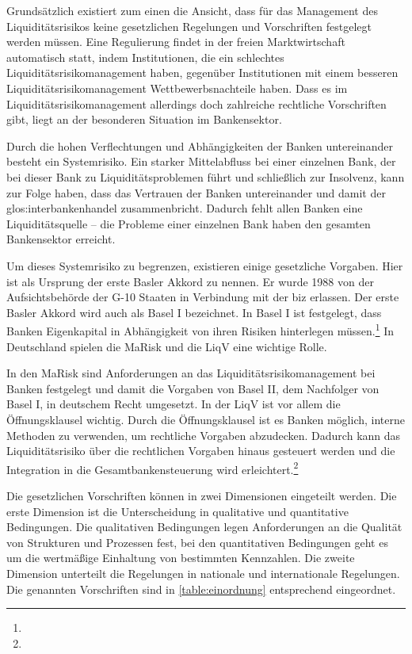 \begin{onehalfspacing}
Grundsätzlich existiert zum einen die Ansicht, dass für das Management des Liquiditätsrisikos keine gesetzlichen Regelungen und Vorschriften festgelegt werden müssen. Eine Regulierung findet in der freien Marktwirtschaft automatisch statt, indem Institutionen, die ein schlechtes Liquiditätsrisikomanagement haben, gegenüber Institutionen mit einem besseren Liquiditätsrisikomanagement Wettbewerbsnachteile haben. Dass es im Liquiditätsrisikomanagement allerdings doch zahlreiche rechtliche Vorschriften gibt, liegt an der besonderen Situation im Bankensektor.

Durch die hohen Verflechtungen und Abhängigkeiten der Banken untereinander besteht ein Systemrisiko. Ein starker Mittelabfluss bei einer einzelnen Bank, der bei dieser Bank zu Liquiditätsproblemen führt und schließlich zur Insolvenz, kann zur Folge haben, dass das Vertrauen der Banken untereinander und damit der \gls{glos:interbankenhandel} zusammenbricht. Dadurch fehlt allen Banken eine Liquiditätsquelle -- die Probleme einer einzelnen Bank haben den gesamten Bankensektor erreicht.

Um dieses Systemrisiko zu begrenzen, existieren einige gesetzliche Vorgaben. Hier ist als Ursprung der erste Basler Akkord zu nennen. Er wurde 1988 von der Aufsichtsbehörde der G-10 Staaten in Verbindung mit der \gls{biz} erlassen. Der erste Basler Akkord wird auch als Basel I bezeichnet. In Basel I ist festgelegt, dass Banken Eigenkapital in Abhängigkeit von ihren Risiken hinterlegen müssen.\footnote{ } In Deutschland spielen die \gls{MaRisk} und die \gls{LiqV} eine wichtige Rolle.

In den \gls{MaRisk} sind Anforderungen an das Liquiditätsrisikomanagement bei Banken festgelegt und damit die Vorgaben von Basel II, dem Nachfolger von Basel I, in deutschem Recht umgesetzt. In der \gls{LiqV} ist vor allem die Öffnungsklausel wichtig. Durch die Öffnungsklausel ist es Banken möglich, interne Methoden zu verwenden, um rechtliche Vorgaben abzudecken. Dadurch kann das Liquiditätsrisiko über die rechtlichen Vorgaben hinaus gesteuert werden und die Integration in die Gesamtbankensteuerung wird erleichtert.\footnote{ }

Die gesetzlichen Vorschriften können in zwei Dimensionen eingeteilt werden. Die erste Dimension ist die Unterscheidung in qualitative und quantitative Bedingungen. Die qualitativen Bedingungen legen Anforderungen an die Qualität von Strukturen und Prozessen fest, bei den quantitativen Bedingungen geht es um die wertmäßige Einhaltung von bestimmten Kennzahlen. Die zweite Dimension unterteilt die Regelungen in nationale und internationale Regelungen. Die genannten Vorschriften sind in \vref{table:einordnung} entsprechend eingeordnet.


\end{onehalfspacing}
